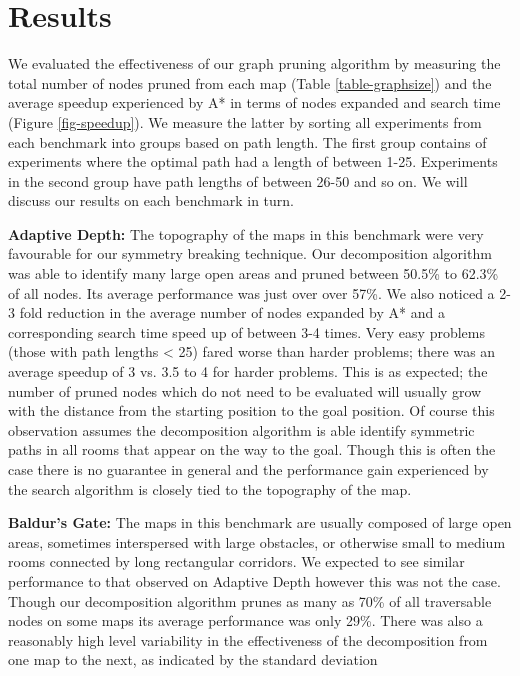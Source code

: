\section{Results}
\label{sec-results}
We evaluated the effectiveness of our graph pruning algorithm by measuring the 
total number of nodes pruned from each map (Table \ref{table-graphsize}) and
the average speedup experienced by A* in terms of nodes expanded and search time
(Figure \ref{fig-speedup}).
We measure the latter by sorting all experiments from each benchmark into
groups based on path length. 
The first group contains of experiments where the optimal path had a length
of between 1-25. 
Experiments in the second group have path lengths of between 26-50 and so on.
We will discuss our results on each benchmark in turn.

\textbf{Adaptive Depth:} 
The topography of the maps in this benchmark were very favourable for our
symmetry breaking technique.
Our decomposition algorithm was able to identify many large open areas and
pruned between 50.5\% to 62.3\% of all nodes.
Its average performance was just over over 57\%. 
We also noticed a 2-3 fold reduction in the average number of nodes expanded 
by A* and a corresponding search time speed up of between 3-4 times.
Very easy problems (those with path lengths < 25) fared worse than harder
problems; there was an average speedup of 3 vs. 3.5 to 4 for harder problems.
This is as expected; the number of pruned nodes which do not need to be evaluated
will usually grow with the distance from the starting position to the goal
position. 
Of course this observation assumes the decomposition algorithm is able identify
symmetric paths in all rooms that appear on the way to the goal.
Though this is often the case there is no guarantee in general and the performance
gain experienced by the search algorithm is closely tied to the topography of 
the map.
\par
\textbf{Baldur's Gate: }
The maps in this benchmark are usually composed of large open areas, sometimes
interspersed with large obstacles, or otherwise small to medium rooms connected
by long rectangular corridors.
We expected to see similar performance to that observed on Adaptive Depth
however this was not the case.
Though our decomposition algorithm prunes as many as 70\% of all traversable nodes 
on some maps its average performance was only 29\%. 
There was also a reasonably high level variability in the effectiveness of the 
decomposition from one map to the next, as indicated by the standard deviation
